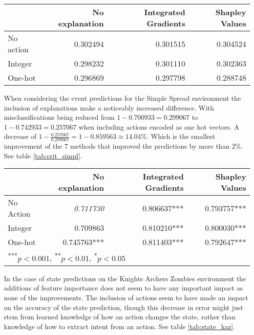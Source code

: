 \documentclass[UKenglish]{uiomasterthesis}
\begin{document}
\begin{center}
\label{tab:state_simpl}
\begin{tabular}{lrrr}
\toprule
 & No explanation & Integrated Gradients & Shapley Values \\
\midrule
No action & 0.302494 & 0.301515 & 0.304524 \\
Integer & 0.298232 & 0.301110 & 0.302363 \\
One-hot & 0.296869 & 0.297798 & 0.288748\\
\bottomrule
\end{tabular}
\end{center}


When considering the event predictions for the Simple Spread environment the inclusion of explanations make a noticeably increased difference. With misclassifications being reduced from $1 - 0.700933 = 0.299067$ to $1-0.742933=0.257067$ when including actions encoded as one hot vectors. A decrease of $1 - \frac{0.257067}{0.299067} = 1 - 0.859563 \approx 14.04\%$. Which is the smallest improvement of the $7$ methods that improved the predictions by more than $2\%$. See table \ref{tab:crit_simpl}.

\begin{center}
\label{tab:crit_simpl}
\begin{tabular}{lrrr}
\toprule
 & No explanation & Integrated Gradients & Shapley Values \\
\midrule
    No Action & \textit{0.711730} & 0.806637*** & 0.793757*** \\
Integer & 0.709863 & 0.810210*** & 0.800030*** \\
One-hot & 0.745763*** & 0.811403*** & 0.792647*** \\
\bottomrule
\multicolumn{3}{l}{\textsuperscript{***}$p<0.001$, 
  \textsuperscript{**}$p<0.01$, 
  \textsuperscript{*}$p<0.05$}
\end{tabular}
\end{center}


In the case of state predictions on the Knights Archers Zombies environment the additions of feature importance does not seem to have any important impact as none of the improvements. The inclusion of actions seem to have made an impact on the accuracy of the state prediction, though this decrease in error might just stem from learned knowledge of how an action changes the state, rather than knowledge of how to extract intent from an action. See table \ref{tab:state_kaz}.
\end{document}
